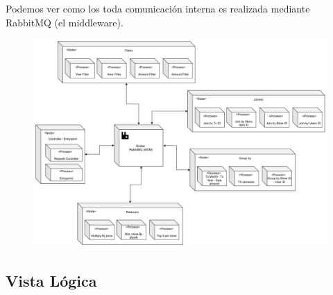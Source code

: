 \documentclass[titlepage,a4paper]{article}
\begin{document}
Podemos ver como los toda comunicación interna es realizada mediante RabbitMQ (el middleware).

\begin{figure}[H]
    \centering
    \includegraphics[width=1\linewidth]{despliegue.png}
\end{figure}


\subsection{Vista Lógica}
\end{document}
